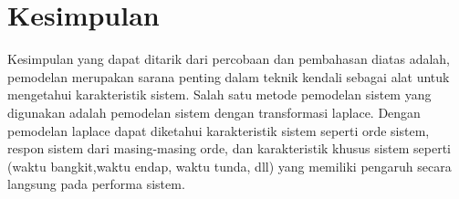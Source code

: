 \documentclass[../laporan]{subfiles}
\begin{document}
\section{Kesimpulan}

Kesimpulan yang dapat ditarik dari percobaan dan pembahasan diatas adalah, pemodelan merupakan sarana penting dalam teknik kendali sebagai alat untuk mengetahui karakteristik sistem. Salah satu metode pemodelan sistem yang digunakan adalah pemodelan sistem dengan transformasi laplace. Dengan pemodelan laplace dapat diketahui karakteristik sistem seperti orde sistem, respon sistem dari masing-masing orde, dan karakteristik khusus sistem seperti (waktu bangkit,waktu endap, waktu tunda, dll) yang memiliki pengaruh secara langsung pada performa sistem.
\end{document}

